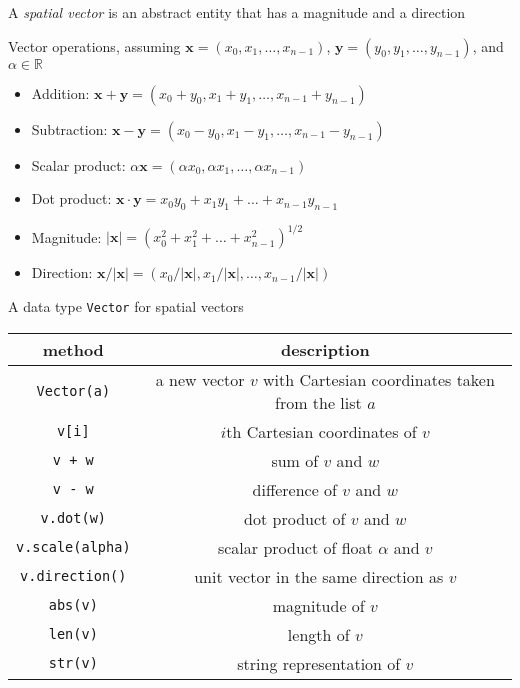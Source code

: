 \documentclass[8pt,a4paper,compress,handout]{beamer}
\begin{document}
\begin{frame}[fragile]
A \emph{spatial vector} is an abstract entity that has a magnitude and a direction

\bigskip

Vector operations, assuming $\mathbf{x}=(x_0,x_1,\dots,x_{n-1})$, $\mathbf{y}=(y_0,y_1,\dots,y_{n-1})$, and $\alpha \in \mathbb{R}$
\begin{itemize}
\item Addition: $\mathbf{x}+\mathbf{y}=(x_0+y_0,x_1+y_1,\dots,x_{n-1}+y_{n-1})$
\item Subtraction: $\mathbf{x}-\mathbf{y}=(x_0-y_0,x_1-y_1,\dots,x_{n-1}-y_{n-1})$
\item Scalar product: $\alpha\mathbf{x}=(\alpha x_0,\alpha x_1,\dots,\alpha x_{n-1})$
\item Dot product: $\mathbf{x}\cdot\mathbf{y}=x_0y_0+x_1y_1+\dots+x_{n-1}y_{n-1}$
\item Magnitude: $|\mathbf{x}|=(x_0^2+x_1^2+\dots+x_{n-1}^2)^{1/2}$
\item Direction: $\mathbf{x}/|\mathbf{x}|=(x_0/|\mathbf{x}|,x_1/|\mathbf{x}|,\dots,x_{n-1}/|\mathbf{x}|)$
\end{itemize}
\end{frame}

\begin{frame}[fragile]
A data type \lstinline{Vector} for spatial vectors
\begin{center}
\begin{tabular}{cc}
method & description \\ \hline
\lstinline$Vector(a)$ & a new vector $v$ with Cartesian coordinates taken from the list $a$ \\
\lstinline$v[i]$ & $i$th Cartesian coordinates of $v$ \\
\lstinline$v + w$ & sum of $v$ and $w$ \\
\lstinline$v - w$ & difference of $v$ and $w$ \\
\lstinline$v.dot(w)$ & dot product of $v$ and $w$ \\
\lstinline$v.scale(alpha)$ & scalar product of float $\alpha$ and $v$ \\
\lstinline$v.direction()$ & unit vector in the same direction as $v$ \\
\lstinline$abs(v)$ & magnitude of $v$ \\
\lstinline$len(v)$ & length of $v$ \\
\lstinline$str(v)$ & string representation of $v$
\end{tabular} 
\end{center}
\end{frame}
\end{document}
